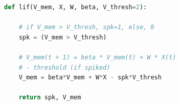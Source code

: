 \begin{lstlisting}[language=Python, caption={Python implementation of the simplified full action potential simulation of a LIF:
		\textbf{V\_mem}: current membrane potential;
		\textbf{X}: input current (assumed constant during dt);
		\textbf{V\_thresh=2}: firing threshold, when V\_mem > V\_thresh, the neuron "spikes";
	}, label={lst:membranepotentialfullsimplified}]
def lif(V_mem, X, W, beta, V_thresh=2):

	# if V_mem > V_thresh, spk=1, else, 0
	spk = (V_mem > V_thresh)
	
	# V_mem(t + 1) = beta * V_mem(t) + W * X(t) 
	# - threshold (if spiked)
	V_mem = beta*V_mem + W*X - spk*V_thresh
	
	return spk, V_mem
\end{lstlisting}
